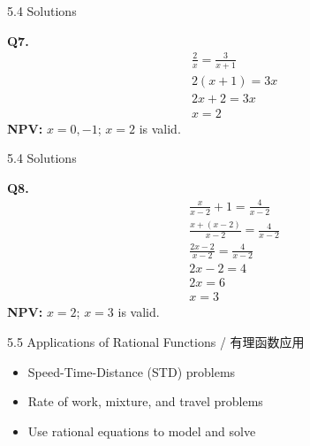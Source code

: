 \documentclass[aspectratio=169]{beamer}
\begin{document}

\begin{frame}{5.4 Solutions}
    \begin{tcolorbox}[colback=lightgray,colframe=primary,title=Solutions]
        \footnotesize
        \textbf{Q7.}
        \begin{align*}
            &\frac{2}{x} = \frac{3}{x+1} \\
            &2(x+1) = 3x \\
            &2x+2 = 3x \\
            &x=2
        \end{align*}
        \textbf{NPV:} $x=0,-1$; $x=2$ is valid.
    \end{tcolorbox}
\end{frame}

\begin{frame}{5.4 Solutions}
    \begin{tcolorbox}[colback=lightgray,colframe=primary,title=Solutions]
        \footnotesize
        \textbf{Q8.}
        \begin{align*}
            &\frac{x}{x-2} + 1 = \frac{4}{x-2} \\
            &\frac{x+ (x-2)}{x-2} = \frac{4}{x-2} \\
            &\frac{2x-2}{x-2} = \frac{4}{x-2} \\
            &2x-2=4 \\
            &2x=6 \\
            &x=3
        \end{align*}
        \textbf{NPV:} $x=2$; $x=3$ is valid.
    \end{tcolorbox}
\end{frame}

\begin{frame}{5.5 Applications of Rational Functions / 有理函数应用}
    \begin{tcolorbox}[colback=lightgray,colframe=primary,title=Key Points / 重点]
        \footnotesize
        \begin{itemize}
            \item Speed-Time-Distance (STD) problems
            \item Rate of work, mixture, and travel problems
            \item Use rational equations to model and solve
        \end{itemize}
    \end{tcolorbox}
\end{frame}
\end{document}

